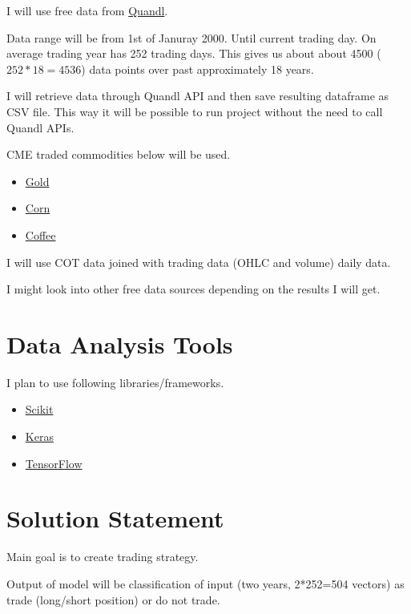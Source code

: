 \documentclass[final,2p]{elsarticle}
\begin{document}
I will use free data from \href{https://www.quandl.com/}{Quandl}. 

Data range will be from 1st of Januray 2000. Until current trading day. On average trading year has 252 trading days. This gives us about about 4500 ($252*18 = 4536$) data points over past approximately 18 years.

I will retrieve data through Quandl API and then save resulting dataframe as CSV file.
This way it will be possible to run project without the need to call Quandl APIs.

CME traded commodities below will be used.

\begin{itemize}
\item \href{https://www.cmegroup.com/trading/metals/precious/gold.html}{Gold}
\item \href{https://www.cmegroup.com/trading/agricultural/grain-and-oilseed/corn.html}{Corn}
\item \href{https://www.cmegroup.com/trading/agricultural/softs/coffee.html}{Coffee}
\end{itemize}

I will use COT data joined with trading data (OHLC and volume) daily data.

I might look into other free data sources depending on the results I will get.

\section{Data Analysis Tools}

I plan to use following libraries/frameworks.

\begin{itemize}
    \item \href{https://scikit-learn.org/}{Scikit}
    \item \href{https://keras.io/}{Keras}
    \item \href{https://www.tensorflow.org/}{TensorFlow}
\end{itemize}

\section{Solution Statement}

Main goal is to create trading strategy.

Output of model will be classification of input (two years, 2*252=504 vectors) as trade (long/short position) or do not trade.
\end{document}
